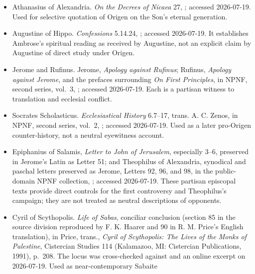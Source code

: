 \begin{itemize}
{index}; accessed 2026-07-19. Used for the existence and principal object of
early criticism, not for a reconstructed complete treatise.
\item Athanasius of Alexandria. \emph{On the Decrees of Nicaea} 27,
; accessed 2026-07-19. Used for selective quotation of Origen on
the Son's eternal generation.
\item Augustine of Hippo. \emph{Confessions} 5.14.24,
; accessed 2026-07-19. It establishes Ambrose's spiritual reading
as received by Augustine, not an explicit claim by Augustine of direct study
under Origen.
\item Jerome and Rufinus. Jerome, \emph{Apology against Rufinus}; Rufinus,
\emph{Apology against Jerome}, and the prefaces surrounding \emph{On First
Principles}, in NPNF, second series, vol.~3,
; accessed 2026-07-19. Each is a partisan witness to translation and
ecclesial conflict.
\item Socrates Scholasticus. \emph{Ecclesiastical History} 6.7--17, trans.
A. C. Zenos, in NPNF, second series, vol.~2,
; accessed
2026-07-19. Used as a later pro-Origen counter-history, not a neutral
eyewitness account.
\item Epiphanius of Salamis, \emph{Letter to John of Jerusalem}, especially
3--6, preserved in Jerome's Latin as Letter 51; and Theophilus of Alexandria,
synodical and paschal letters preserved as Jerome, Letters 92, 96, and 98, in
the public-domain NPNF collection,
;
accessed 2026-07-19. These partisan episcopal texts provide direct controls for
the first controversy and Theophilus's campaign; they are not treated as
neutral descriptions of opponents.
\item Cyril of Scythopolis. \emph{Life of Sabas}, conciliar conclusion
(section 85 in the source division reproduced by F. K. Haarer and 90 in R. M.
Price's English translation), in Price, trans., \emph{Cyril of Scythopolis:
The Lives of the Monks of Palestine}, Cistercian Studies 114 (Kalamazoo, MI:
Cistercian Publications, 1991), p.~208. The locus was cross-checked against
and an online excerpt on 2026-07-19. Used as near-contemporary Sabaite

\end{itemize}
